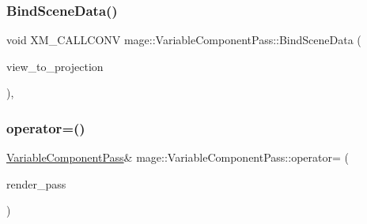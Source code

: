 \hypertarget{classmage_1_1_variable_component_pass_a173b059d60e8c0cc9b08fea5e896d3ca}{}\label{classmage_1_1_variable_component_pass_a173b059d60e8c0cc9b08fea5e896d3ca} 
\subsubsection{\texorpdfstring{Bind\+Scene\+Data()}{BindSceneData()}}
{\footnotesize\ttfamily void X\+M\+\_\+\+C\+A\+L\+L\+C\+O\+NV mage\+::\+Variable\+Component\+Pass\+::\+Bind\+Scene\+Data (\begin{DoxyParamCaption}\item[{F\+X\+M\+M\+A\+T\+R\+IX}]{view\+\_\+to\+\_\+projection }\end{DoxyParamCaption})\hspace{0.3cm}{\ttfamily [private]}, {\ttfamily [noexcept]}}

\hypertarget{classmage_1_1_variable_component_pass_a9df39d8323fea2b411a4f84abe8bac3c}{}\label{classmage_1_1_variable_component_pass_a9df39d8323fea2b411a4f84abe8bac3c} 
\subsubsection{\texorpdfstring{operator=()}{operator=()}\hspace{0.1cm}{\footnotesize\ttfamily [1/2]}}
{\footnotesize\ttfamily \hyperlink{classmage_1_1_variable_component_pass}{Variable\+Component\+Pass}\& mage\+::\+Variable\+Component\+Pass\+::operator= (\begin{DoxyParamCaption}\item[{const \hyperlink{classmage_1_1_variable_component_pass}{Variable\+Component\+Pass} \&}]{render\+\_\+pass }\end{DoxyParamCaption})\hspace{0.3cm}{\ttfamily [delete]}}

\hypertarget{classmage_1_1_variable_component_pass_ab4c2ccc632031ec51c16f7c9d500e427}{}\label{classmage_1_1_variable_component_pass_ab4c2ccc632031ec51c16f7c9d500e427} 
